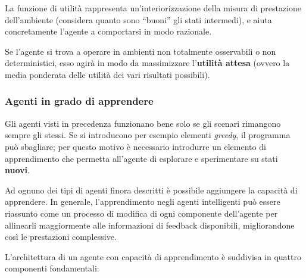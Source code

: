 \documentclass[a4paper,11pt]{report}
\begin{document}
La funzione di utilità rappresenta un'interiorizzazione della misura di prestazione dell'ambiente (considera quanto sono ``buoni'' gli stati intermedi), e aiuta concretamente l'agente a comportarsi in modo razionale. 

Se l'agente si trova a operare in ambienti non totalmente osservabili o non deterministici, esso agirà in modo da massimizzare l'\textbf{utilità attesa} (ovvero la media ponderata delle utilità dei vari risultati possibili).

\subsubsection{Agenti in grado di apprendere}
Gli agenti visti in precedenza funzionano bene solo se gli scenari rimangono sempre gli stessi. Se si introducono per esempio elementi \textit{greedy}, il programma può sbagliare; per questo motivo è necessario introdurre un elemento di apprendimento che permetta all'agente di esplorare e sperimentare su stati \textbf{nuovi}.

Ad ognuno dei tipi di agenti finora descritti è possibile aggiungere la capacità di apprendere. In generale, l'apprendimento negli agenti intelligenti può essere riassunto come un processo di modifica di ogni componente dell'agente per allinearli maggiormente alle informazioni di feedback disponibili, migliorandone così le prestazioni complessive.

L'architettura di un agente con capacità di apprendimento è suddivisa in quattro componenti fondamentali:
\end{document}
